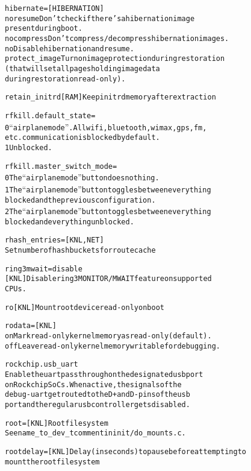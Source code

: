 \documentclass[a4paper,8pt,english]{sphinxmanual}
\begin{document}
\begin{alltt}
        hibernate=      {[}HIBERNATION{]}
                noresume        Don't check if there's a hibernation image
                                present during boot.
                nocompress      Don't compress/decompress hibernation images.
                no              Disable hibernation and resume.
                protect\_image   Turn on image protection during restoration
                                (that will set all pages holding image data
                                during restoration read-only).

        retain\_initrd   {[}RAM{]} Keep initrd memory after extraction

        rfkill.default\_state=
                0       ``airplane mode''.  All wifi, bluetooth, wimax, gps, fm,
                        etc. communication is blocked by default.
                1       Unblocked.

        rfkill.master\_switch\_mode=
                0       The ``airplane mode'' button does nothing.
                1       The ``airplane mode'' button toggles between everything
                        blocked and the previous configuration.
                2       The ``airplane mode'' button toggles between everything
                        blocked and everything unblocked.

        rhash\_entries=  {[}KNL,NET{]}
                        Set number of hash buckets for route cache

        ring3mwait=disable
                        {[}KNL{]} Disable ring 3 MONITOR/MWAIT feature on supported
                        CPUs.

        ro              {[}KNL{]} Mount root device read-only on boot

        rodata=         {[}KNL{]}
                on      Mark read-only kernel memory as read-only (default).
                off     Leave read-only kernel memory writable for debugging.

        rockchip.usb\_uart
                        Enable the uart passthrough on the designated usb port
                        on Rockchip SoCs. When active, the signals of the
                        debug-uart get routed to the D+ and D- pins of the usb
                        port and the regular usb controller gets disabled.

        root=           {[}KNL{]} Root filesystem
                        See name\_to\_dev\_t comment in init/do\_mounts.c.

        rootdelay=      {[}KNL{]} Delay (in seconds) to pause before attempting to
                        mount the root filesystem


\end{alltt}
\end{document}
